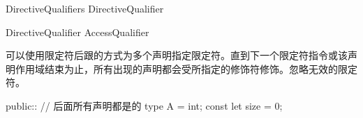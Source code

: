 \begin{bnf}{DirectiveQualifiers}
    DirectiveQualifier\bnfp
\end{bnf}

\begin{bnf}{DirectiveQualifier}
    AccessQualifier
\end{bnf}

\pnum
可以使用限定符后跟\tcode{::}的方式为多个声明指定限定符。直到下一个限定符指令或该声明作用域结束为止，所有出现的声明都会受所指定的修饰符修饰。忽略无效的限定符。

\enterexample
\begin{codeblock}
public:: // 后面所有声明都是的
type A = int;
const let size = 0;
\end{codeblock}